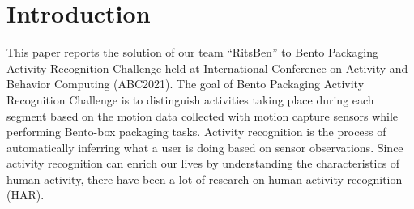 \documentclass[graybox]{svmult}
\begin{document}
\section{Introduction}
\label{sec:introduction}
This paper reports the solution of our team ``RitsBen'' to Bento Packaging Activity Recognition Challenge held at International Conference on Activity and Behavior Computing (ABC2021). 
The goal of Bento Packaging Activity Recognition Challenge is to distinguish activities taking place during each segment based on the motion data collected with motion capture sensors while performing Bento-box packaging tasks. Activity recognition is the process of automatically inferring what a user is doing based on sensor observations. Since activity recognition can enrich our lives by understanding the characteristics of human activity, there have been a lot of research on human activity recognition (HAR). 
\end{document}
